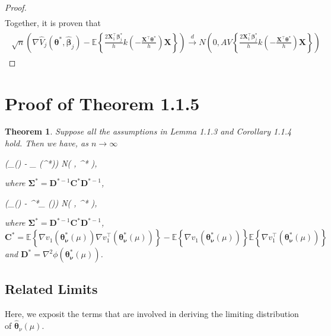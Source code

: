 \documentclass[12pt]{article}
\newcommand{\wh}{\widehat}
\newcommand{\itl}{\intercal}
\newcommand{\bs}{ \boldsymbol}
\newcommand{\lt}{\left}
\newcommand{\rt}{\right}
\newtheorem{theorem}{Theorem}[section]
\begin{document}
\begin{proof}
\begin{gather*}
	\end{gather*}
	Together, it is proven that
	\begin{gather}
	\begin{flalign*}
	\sqrt{n}\lt(\nabla\wh{V}_j\lt(\bs{\theta}^* , \wh{\bs{\beta}}_j\rt) - \mathbb{E}\lt\{\frac{2\bs{X}_{1}^{\intercal}\bs{\beta}^*_j}{h}k\lt(-\frac{\bs{X}^{\intercal}\bs{\theta}^*}{h}\rt)\bs{X}\rt\}\rt)\overset{d}{\to}N\lt(0,AV\lt\{\frac{2\bs{X}_1^{\itl}\bs{\beta}^*_j}{h}k\lt(-\frac{\bs{X}^{\itl}\bs{\theta}^*}{h}\rt)\bs{X}\rt\}\rt)
	\end{flalign*}
	\end{gather}
\end{proof}		

\section{Proof of Theorem 1.1.5}
\begin{theorem}
	Suppose all the assumptions in Lemma 1.1.3 and Corollary 1.1.4 hold. Then we have, as $n\to \infty$
	\begin{flalign*}
	\lt(\widehat{\bs{\theta}}_{\nu}(\mu) - \bs{\theta}_{\bs{\nu}}(\mu^*)\rt)  N\lt(\bs{0}, \bs{\Sigma}^* \rt),
	\end{flalign*}
	where $\bs{\Sigma}^* = \bs{D}^{*-1}\bs{C}^{*}\bs{D}^{*-1}$, 
	
	\begin{flalign*}
	\lt(\widehat{\bs{\theta}}_{\nu}(\mu) - \bs{\theta}^*_{\bs{\nu}}(\mu)\rt)  N\lt(\bs{0}, \bs{\Sigma}^* \rt),
	\end{flalign*}
	where $\bs{\Sigma}^* = \bs{D}^{*-1}\bs{C}^{*}\bs{D}^{*-1}$, 
	$\bs{C}^* =\mathbb{E}\lt\{  \nabla v_1\lt(\bs{\theta}^*_{\bs{\nu}}(\mu)\rt)\nabla v^{\itl}_1\lt(\bs{\theta}^*_{\bs{\nu}}(\mu)\rt) \rt\} - \mathbb{E}\lt\{\nabla v_1\lt(\bs{\theta}^*_{\bs{\nu}}(\mu)\rt)\rt\} \mathbb{E}\lt\{\nabla v^{\itl}_1\lt(\bs{\theta}^*_{\bs{\nu}}(\mu)\rt)\rt\}$ and $\bs{D}^*  =  \nabla^2 \phi(\bs{\theta}^*_{\bs{\nu}}(\mu))$.
\end{theorem}

\subsection{Related Limits}
Here, we exposit the terms that are involved in deriving the limiting distribution of $\widehat{\bs{\theta}}_{\nu}\lt(\mu\rt)$. 
\end{document}
